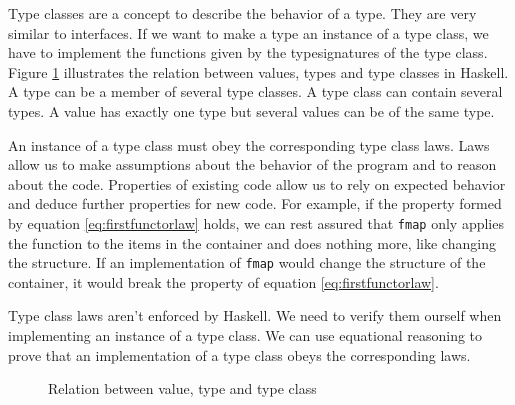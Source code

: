 Type classes are a concept to describe the behavior of a type. 
They are very similar to interfaces. If we want to make a type an instance of a type class, we have to implement the functions given by the \glspl{typesignature} of the type class. Figure \ref{fig:typeclassrelation} illustrates the relation between values, types and type classes in Haskell. A type can be a member of several type classes. A type class can contain several types. A value has exactly one type but several values can be of the same type.

An instance of a type class must obey the corresponding type class laws. Laws allow us to make assumptions about the behavior of the program and to reason about the code. Properties of existing code allow us to rely on expected behavior and deduce further properties for new code. For example, if the property formed by equation \ref{eq:firstfunctorlaw} holds, we can rest assured that \verb|fmap| only applies the function to the items in the container and does nothing more, like changing the structure. If an implementation of \verb|fmap| would change the structure of the container, it would break the property of equation \ref{eq:firstfunctorlaw}.

Type class laws aren't enforced by Haskell. We need to verify them ourself when implementing an instance of a type class. We can use equational reasoning to prove that an implementation of a type class obeys the corresponding laws.


\begin{figure}
\centering
{}
\caption{Relation between value, type and type class}
\label{fig:typeclassrelation}
\end{figure}
